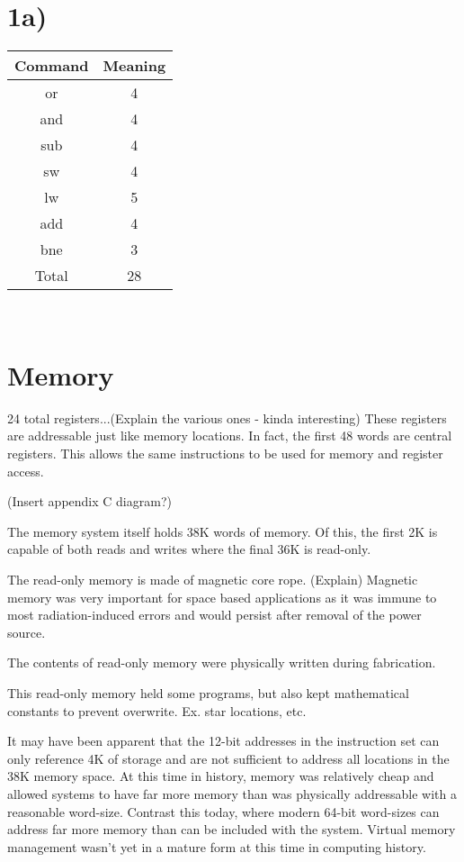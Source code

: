 \documentclass[a4paper,11pt]{article}
\begin{document}
\section*{1a)}
\begin{center}
\begin{tabular}{| c | c |}
  \hline	
  	Command & Meaning \\ \hline \hline
	or & 4 \\ \hline
	and & 4 \\ \hline
	sub & 4 \\ \hline
	sw & 4 \\ \hline
	lw & 5 \\ \hline
	add & 4 \\ \hline
	bne & 3 \\ \hline \hline
	Total & 28 \\ \hline
\end{tabular} \\
\end{center}


\section{Memory}

24 total registers...(Explain the various ones - kinda interesting)
These registers are addressable just like memory locations.  In fact, the first 48 words are central registers.  This allows the same instructions to be used for memory and register access. 

(Insert appendix C diagram?)

The memory system itself holds 38K words of memory.  Of this, the first 2K is capable of both reads and writes where the final 36K is read-only.  

The read-only memory is made of magnetic core rope.  (Explain)  Magnetic memory was very important for space based applications as it was immune to most radiation-induced errors and would persist after removal of the power source. 

The contents of read-only memory were physically written during fabrication.  

This read-only memory held some programs, but also kept mathematical constants to prevent overwrite.  Ex. star locations, etc.

It may have been apparent that the 12-bit addresses in the instruction set can only reference 4K of storage and are not sufficient to address all locations in the 38K memory space.  At this time in history, memory was relatively cheap and allowed systems to have far more memory than was physically addressable with a reasonable word-size.  Contrast this today, where modern 64-bit word-sizes can address far more memory than can be included with the system.  
Virtual memory management wasn't yet in a mature form at this time in computing history. 
\end{document}
